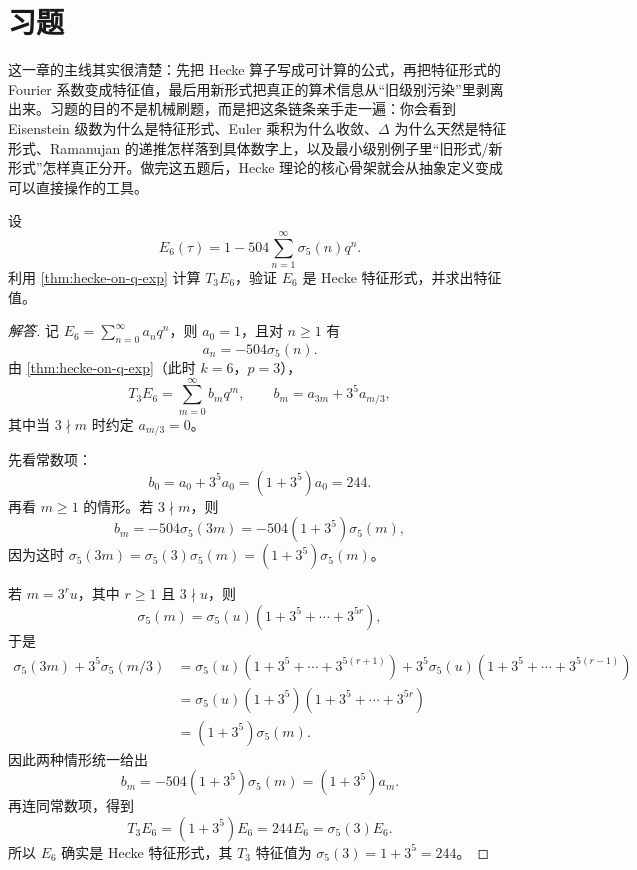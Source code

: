\section{习题}
\label{sec:hecke-exercises}

这一章的主线其实很清楚：先把 Hecke 算子写成可计算的公式，再把特征形式的 Fourier 系数变成特征值，最后用新形式把真正的算术信息从“旧级别污染”里剥离出来。习题的目的不是机械刷题，而是把这条链条亲手走一遍：你会看到 Eisenstein 级数为什么是特征形式、Euler 乘积为什么收敛、$\Delta$ 为什么天然是特征形式、Ramanujan 的递推怎样落到具体数字上，以及最小级别例子里“旧形式/新形式”怎样真正分开。做完这五题后，Hecke 理论的核心骨架就会从抽象定义变成可以直接操作的工具。



\begin{exercise}
\label{ex:hecke-e6}
设
\[
  E_6(\tau)=1-504\sum_{n=1}^{\infty}\sigma_5(n)q^n.
\]
利用 \cref{thm:hecke-on-q-exp} 计算 $T_3E_6$，验证 $E_6$ 是 Hecke 特征形式，并求出特征值。
\end{exercise}

\begin{proof}[解答]
记 $E_6=\sum_{n=0}^{\infty}a_nq^n$，则 $a_0=1$，且对 $n\ge1$ 有
\[
  a_n=-504\sigma_5(n).
\]
由 \cref{thm:hecke-on-q-exp}（此时 $k=6$，$p=3$），
\[
  T_3E_6=\sum_{m=0}^{\infty}b_mq^m,
  \qquad
  b_m=a_{3m}+3^5a_{m/3},
\]
其中当 $3\nmid m$ 时约定 $a_{m/3}=0$。

先看常数项：
\[
  b_0=a_0+3^5a_0=(1+3^5)a_0=244.
\]
再看 $m\ge1$ 的情形。若 $3\nmid m$，则
\[
  b_m=-504\sigma_5(3m)=-504(1+3^5)\sigma_5(m),
\]
因为这时 $\sigma_5(3m)=\sigma_5(3)\sigma_5(m)=(1+3^5)\sigma_5(m)$。

若 $m=3^ru$，其中 $r\ge1$ 且 $3\nmid u$，则
\[
  \sigma_5(m)=\sigma_5(u)(1+3^5+\cdots+3^{5r}),
\]
于是
\begin{align*}
  \sigma_5(3m)+3^5\sigma_5(m/3)
  &=\sigma_5(u)(1+3^5+\cdots+3^{5(r+1)})
    +3^5\sigma_5(u)(1+3^5+\cdots+3^{5(r-1)})\\
  &=\sigma_5(u)(1+3^5)(1+3^5+\cdots+3^{5r})\\
  &=(1+3^5)\sigma_5(m).
\end{align*}
因此两种情形统一给出
\[
  b_m=-504(1+3^5)\sigma_5(m)=(1+3^5)a_m.
\]
再连同常数项，得到
\[
  T_3E_6=(1+3^5)E_6=244E_6=\sigma_5(3)E_6.
\]
所以 $E_6$ 确实是 Hecke 特征形式，其 $T_3$ 特征值为
$\sigma_5(3)=1+3^5=244$。
\end{proof}

